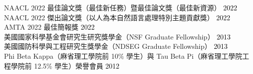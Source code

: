 {}

NAACL 2022 最佳論文獎（最佳新任務）暨最佳論文獎（最佳新資源） \hfill \textcolor{black}{2022}\\ %
NAACL 2022 傑出論文獎（以人為本自然語言處理特別主題貢獻獎） \hfill \textcolor{black}{2022}\\ %
AMTA 2022 最佳簡報獎 \hfill \textcolor{black}{2022}\\ %
美國國家科學基金會研究生研究獎學金（NSF Graduate Fellowship） \hfill \textcolor{black}{2013}\\ %
美國國防科學與工程研究生獎學金（NDSEG Graduate Fellowship） \hfill \textcolor{black}{2013}\\ %
Phi Beta Kappa（麻省理工學院前 10\% 學生）與 Tau Beta Pi（麻省理工學院工程學院前 12.5\% 學生）榮譽會員 \hfill \textcolor{black}{2012}\\
